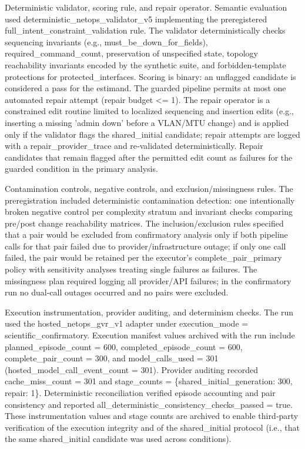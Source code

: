 \documentclass[conference]{IEEEtran}
\begin{document}
Deterministic validator, scoring rule, and repair operator. Semantic evaluation used deterministic\_netops\_validator\_v5 implementing the preregistered full\_intent\_constraint\_validation rule. The validator deterministically checks sequencing invariants (e.g., must\_be\_down\_for\_fields), required\_command\_count, preservation of unspecified state, topology reachability invariants encoded by the synthetic suite, and forbidden‑template protections for protected\_interfaces. Scoring is binary: an unflagged candidate is considered a pass for the estimand. The guarded pipeline permits at most one automated repair attempt (repair budget <= 1). The repair operator is a constrained edit routine limited to localized sequencing and insertion edits (e.g., inserting a missing 'admin down' before a VLAN/MTU change) and is applied only if the validator flags the shared\_initial candidate; repair attempts are logged with a repair\_provider\_trace and re‑validated deterministically. Repair candidates that remain flagged after the permitted edit count as failures for the guarded condition in the primary analysis.

Contamination controls, negative controls, and exclusion/missingness rules. The preregistration included deterministic contamination detection: one intentionally broken negative control per complexity stratum and invariant checks comparing pre/post change reachability matrices. The inclusion/exclusion rules specified that a pair would be excluded from confirmatory analysis only if both pipeline calls for that pair failed due to provider/infrastructure outage; if only one call failed, the pair would be retained per the executor's complete\_pair\_primary policy with sensitivity analyses treating single failures as failures. The missingness plan required logging all provider/API failures; in the confirmatory run no dual‑call outages occurred and no pairs were excluded.

Execution instrumentation, provider auditing, and determinism checks. The run used the hosted\_netops\_gvr\_v1 adapter under execution\_mode = scientific\_confirmatory. Execution manifest values archived with the run include planned\_episode\_count = 600, completed\_episode\_count = 600, complete\_pair\_count = 300, and model\_calls\_used = 301 (hosted\_model\_call\_event\_count = 301). Provider auditing recorded cache\_miss\_count = 301 and stage\_counts = \{shared\_initial\_generation: 300, repair: 1\}. Deterministic reconciliation verified episode accounting and pair consistency and reported all\_deterministic\_consistency\_checks\_passed = true. These instrumentation values and stage counts are archived to enable third‑party verification of the execution integrity and of the shared\_initial protocol (i.e., that the same shared\_initial candidate was used across conditions).
\end{document}
